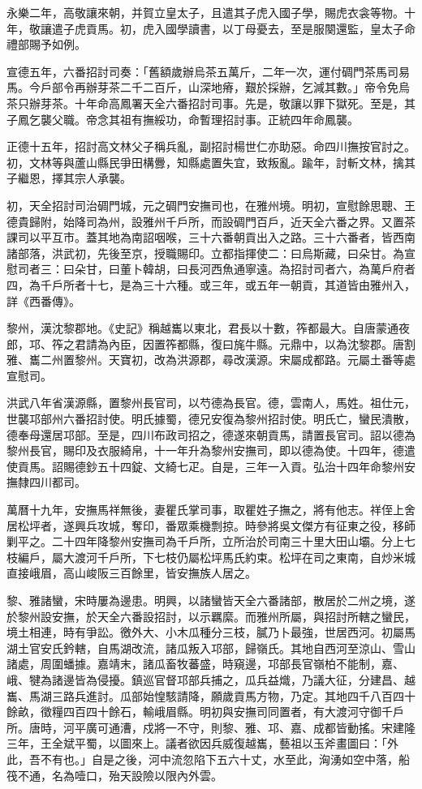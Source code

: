 \begin{pinyinscope}
永樂二年，高敬讓來朝，并賀立皇太子，且遣其子虎入國子學，賜虎衣衾等物。十年，敬讓遣子虎貢馬。初，虎入國學讀書，以丁母憂去，至是服闋還監，皇太子命禮部賜予如例。

宣德五年，六番招討司奏：「舊額歲辦烏茶五萬斤，二年一次，運付碉門茶馬司易馬。今戶部令再辦芽茶二千二百斤，山深地瘠，艱於採辦，乞減其數。」帝令免烏茶只辦芽茶。十年命高鳳署天全六番招討司事。先是，敬讓以罪下獄死。至是，其子鳳乞襲父職。帝念其祖有撫綏功，命暫理招討事。正統四年命鳳襲。

正德十五年，招討高文林父子稱兵亂，副招討楊世仁亦助惡。命四川撫按官討之。初，文林等與蘆山縣民爭田構釁，知縣處置失宜，致叛亂。踰年，討斬文林，擒其子繼恩，擇其宗人承襲。

初，天全招討司治碉門城，元之碉門安撫司也，在雅州境。明初，宣慰餘思聰、王德貴歸附，始降司為州，設雅州千戶所，而設碉門百戶，近天全六番之界。又置茶課司以平互市。蓋其地為南詔咽喉，三十六番朝貢出入之路。三十六番者，皆西南諸部落，洪武初，先後至京，授職賜印。立都指揮使二：曰烏斯藏，曰朵甘。為宣慰司者三：曰朵甘，曰董卜韓胡，曰長河西魚通寧遠。為招討司者六，為萬戶府者四，為千戶所者十七，是為三十六種。或三年，或五年一朝貢，其道皆由雅州入，詳《西番傳》。

黎州，漢沈黎郡地。《史記》稱越巂以東北，君長以十數，筰都最大。自唐蒙通夜郎，邛、筰之君請為內臣，因置筰都縣，復曰旄牛縣。元鼎中，以為沈黎郡。唐割雅、巂二州置黎州。天寶初，改為洪源郡，尋改漢源。宋屬成都路。元屬土番等處宣慰司。

洪武八年省漢源縣，置黎州長官司，以芍德為長官。德，雲南人，馬姓。祖仕元，世襲邛部州六番招討使。明氏據蜀，德兄安復為黎州招討使。明氏亡，蠻民潰散，德奉母還居邛部。至是，四川布政司招之，德遂來朝貢馬，請置長官司。詔以德為黎州長官，賜印及衣服綺帛，十一年升為黎州安撫司，即以德為使。十四年，德遣使貢馬。詔賜德鈔五十四錠、文綺七疋。自是，三年一入貢。弘治十四年命黎州安撫隸四川都司。

萬曆十九年，安撫馬祥無後，妻瞿氏掌司事，取瞿姓子撫之，將有他志。祥侄上舍居松坪者，遂興兵攻城，奪印，番眾乘機剽掠。時參將吳文傑方有征東之役，移師剿平之。二十四年降黎州安撫司為千戶所，立所治於司南三十里大田山壩。分上七枝編戶，屬大渡河千戶所，下七枝仍屬松坪馬氏約束。松坪在司之東南，自炒米城直接峨眉，高山峻阪三百餘里，皆安撫族人居之。

黎、雅諸蠻，宋時屢為邊患。明興，以諸蠻皆天全六番諸部，散居於二州之境，遂於黎州設安撫，於天全六番設招討，以示羈縻。而雅州所屬，與招討所轄之蠻民，境土相連，時有爭訟。徼外大、小木瓜種分三枝，膩乃卜最強，世居西河。初屬馬湖土官安氏鈐轄，自馬湖改流，諸瓜叛入邛部，歸嶺氏。其地自西河至涼山、雪山諸處，周圍蟠據。嘉靖末，諸瓜畜牧蕃盛，時窺邊，邛部長官嶺柏不能制，嘉、峨、犍為諸邊皆為侵擾。鎮巡官督邛部兵捕之，瓜兵益熾，乃議大征，分建昌、越巂、馬湖三路兵進討。瓜部始惶駭請降，願歲貢馬方物，乃定。其地四千八百四十餘畝，徵糧四百四十餘石，輸峨眉縣。明初與安撫司同置者，有大渡河守御千戶所。唐時，河平廣可通漕，戍將一不守，則黎、雅、邛、嘉、成都皆動搖。宋建隆三年，王全斌平蜀，以圖來上。議者欲因兵威復越巂，藝祖以玉斧畫圖曰：「外此，吾不有也。」自是之後，河中流忽陷下五六十丈，水至此，洶湧如空中落，船筏不通，名為噎口，殆天設險以限內外雲。


\end{pinyinscope}